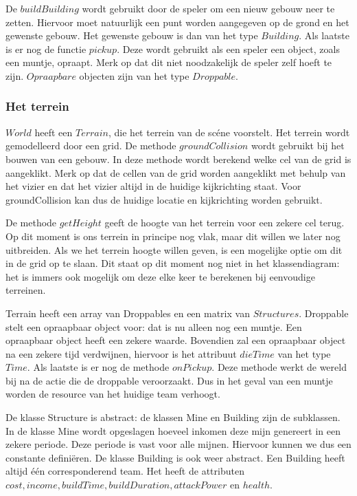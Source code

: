 \documentclass[a4paper,11pt]{article}
\begin{document}
De $buildBuilding$ wordt gebruikt door de speler om een nieuw gebouw neer te zetten. Hiervoor moet natuurlijk een punt worden aangegeven op de grond en het gewenste gebouw. Het gewenste gebouw is dan van het type $Building$. Als laatste is er nog de functie $pickup$. Deze wordt gebruikt als een speler een object, zoals een muntje, opraapt. Merk op dat dit niet noodzakelijk de speler zelf hoeft te zijn. $Opraapbare$ objecten zijn van het type $Droppable$.

\subsubsection{Het terrein}
$World$ heeft een $Terrain$, die het terrein van de sc\'ene voorstelt. Het terrein wordt gemodelleerd door een grid. De methode $groundCollision$ wordt gebruikt bij het bouwen van een gebouw. In deze methode wordt berekend welke cel van de grid is aangeklikt. Merk op dat de cellen van de grid worden aangeklikt met behulp van het vizier en dat het vizier altijd in de huidige kijkrichting staat. Voor groundCollision kan dus de huidige locatie en kijkrichting worden gebruikt.

De methode $getHeight$ geeft de hoogte van het terrein voor een zekere cel terug. Op dit moment is ons terrein in principe nog vlak, maar dit willen we later nog uitbreiden. Als we het terrein hoogte willen geven, is een mogelijke optie om dit in de grid op te slaan. Dit staat op dit moment nog niet in het klassendiagram: het is immers ook mogelijk om deze elke keer te berekenen bij eenvoudige terreinen.

Terrain heeft een array van Droppables en een matrix van $Structures$. Droppable stelt een opraapbaar object voor: dat is nu alleen nog een muntje. Een opraapbaar object heeft een zekere waarde. Bovendien zal een opraapbaar object na een zekere tijd verdwijnen, hiervoor is het attribuut $dieTime$ van het type $Time$. Als laatste is er nog de methode $onPickup$. Deze methode werkt de wereld bij na de actie die de droppable veroorzaakt. Dus in het geval van een muntje worden de resource van het huidige team verhoogt.

De klasse Structure is abstract: de klassen Mine en Building zijn de subklassen. In de klasse Mine wordt opgeslagen hoeveel inkomen deze mijn genereert in een zekere periode. Deze periode is vast voor alle mijnen. Hiervoor kunnen we dus een constante defini\"eren. De klasse Building is ook weer abstract. Een Building heeft altijd \'e\'en corresponderend team. Het heeft de attributen $cost, income, buildTime, buildDuration, attackPower$ en $health$.
\end{document}
